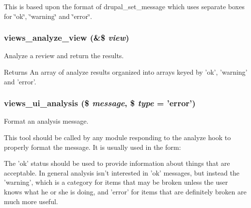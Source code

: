 This is based upon the format of drupal\_\-set\_\-message which uses separate boxes for \char`\"{}ok\char`\"{}, \char`\"{}warning\char`\"{} and \char`\"{}error\char`\"{}. \hypertarget{analyze_8inc_a8f418e18d26fe543f6e960bade40a367}{
\subsubsection[{views\_\-analyze\_\-view}]{\setlength{\rightskip}{0pt plus 5cm}views\_\-analyze\_\-view (\&\$ {\em view})}}
\label{analyze_8inc_a8f418e18d26fe543f6e960bade40a367}
Analyze a review and return the results.

\begin{DoxyReturn}{Returns}
An array of analyze results organized into arrays keyed by 'ok', 'warning' and 'error'. 
\end{DoxyReturn}
\hypertarget{analyze_8inc_aa4f08098638b001519a0f905b102f22a}{
\subsubsection[{views\_\-ui\_\-analysis}]{\setlength{\rightskip}{0pt plus 5cm}views\_\-ui\_\-analysis (\$ {\em message}, \/  \$ {\em type} = {\ttfamily 'error'})}}
\label{analyze_8inc_aa4f08098638b001519a0f905b102f22a}
Format an analysis message.

This tool should be called by any module responding to the analyze hook to properly format the message. It is usually used in the form: 


The 'ok' status should be used to provide information about things that are acceptable. In general analysis isn't interested in 'ok' messages, but instead the 'warning', which is a category for items that may be broken unless the user knows what he or she is doing, and 'error' for items that are definitely broken are much more useful.


